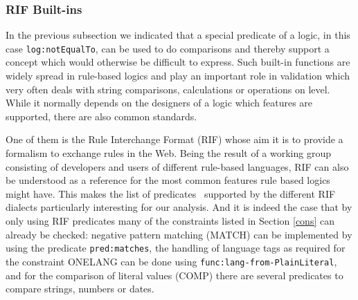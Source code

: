 \subsubsection{RIF Built-ins}\label{bisec}
In the previous subsection we indicated that a special predicate of a logic,
in this case \texttt{log:notEqualTo}, can be used to do \uri comparisons
and thereby support a concept which would otherwise be difficult to express. 
Such built-in functions are widely spread in rule-based logics
and play an important role in \rdf validation which very often deals with string comparisons, calculations or operations on \uri level.
While it normally depends on the designers of a logic which features are supported, there are also common standards. 

One of them is the Rule Interchange Format (RIF) \cite{rif}
whose aim it is to provide a formalism to exchange rules in the Web. 
Being the result of a \wwwc working group consisting of developers and users 
of different rule-based languages, RIF can also be understood as a reference for the most common features rule based logics might have. 
This makes the list of predicates~\cite{rifpredicates} supported by the different RIF dialects particularly interesting for our analysis. 
And it is indeed the case that by
only using RIF predicates many of the constraints listed in Section \ref{cons} can already be checked: 
negative pattern matching (MATCH) can be implemented by using the predicate 
\texttt{pred:matches}, 
the handling of language tags as required for the constraint ONELANG can be done using \texttt{func:lang-from-PlainLiteral}, 
and for the comparison of literal values (COMP) there are several predicates to compare strings, numbers or dates.


